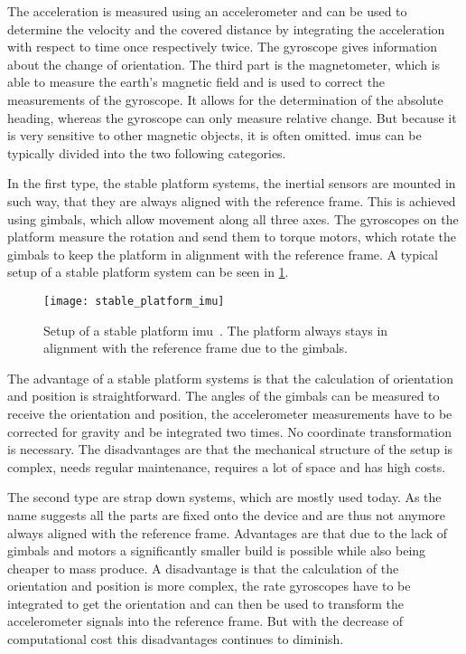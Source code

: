 The acceleration is measured using an accelerometer and can be used to determine the velocity and the covered distance by integrating the acceleration with respect to time once respectively twice.
The gyroscope gives information about the change of orientation.
The third part is the magnetometer, which is able to measure the earth's magnetic field and is used to correct the measurements of the gyroscope.
It allows for the determination of the absolute heading, whereas the gyroscope can only measure relative change. But because it is very sensitive to other magnetic objects, it is often omitted.
\glspl{imu} can be typically divided into the two following categories.

In the first type, the stable platform systems, the inertial sensors are mounted in such way, that they are always aligned with the reference frame.
This is achieved using gimbals, which allow movement along all three axes.
The gyroscopes on the platform measure the rotation and send them to torque motors, which rotate the gimbals to keep the platform in alignment with the reference frame.
A typical setup of a stable platform system can be seen in \cref{fig:stable_platform_imu}.
\begin{figure}[htb]
    \texttt{[image: stable\_platform\_imu]}
    \caption[Setup of a stable platform ]{Setup of a stable platform \acrshort{imu}~\cite{Woodman2007}. The platform always stays in alignment with the reference frame due to the gimbals.}
    \label{fig:stable_platform_imu}
\end{figure}
The advantage of a stable platform systems is that the calculation of orientation and position is straightforward.
The angles of the gimbals can be measured to receive the orientation and position, the accelerometer measurements have to be corrected for gravity and be integrated two times.
No coordinate transformation is necessary.
The disadvantages are that the mechanical structure of the setup is complex, needs regular maintenance, requires a lot of space and has high costs.

The second type are strap down systems, which are mostly used today.
As the name suggests all the parts are fixed onto the device and are thus not anymore always aligned with the reference frame.
Advantages are that due to the lack of gimbals and motors a significantly smaller build is possible while also being cheaper to mass produce.
A disadvantage is that the calculation of the orientation and position is more complex, the rate gyroscopes have to be integrated to get the orientation and can then be used to transform the accelerometer signals into the reference frame.
But with the decrease of computational cost this disadvantages continues to diminish.


